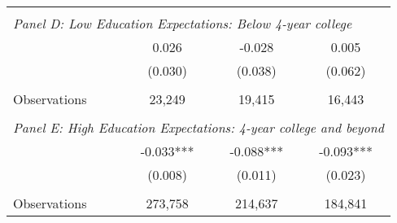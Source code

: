 {\begin{tabular}{lccc}
&  &  &   \\
\multicolumn{4}{l}{\textit{Panel D: Low Education Expectations: Below 4-year college}} \\
\hspace{3mm}        &       0.026   &      -0.028   &       0.005   \\
                    &     (0.030)   &     (0.038)   &     (0.062)   \\
                    &               &               &               \\
\hspace{3mm}Observations&      23,249   &      19,415   &      16,443   \\
 
&  &  &   \\
\multicolumn{4}{l}{\textit{Panel E: High Education Expectations: 4-year college and beyond}} \\
\hspace{3mm}        &      -0.033***&      -0.088***&      -0.093***\\
                    &     (0.008)   &     (0.011)   &     (0.023)   \\
                    &               &               &               \\
\hspace{3mm}Observations&     273,758   &     214,637   &     184,841   \\
 

\bottomrule
\end{tabular}
}
